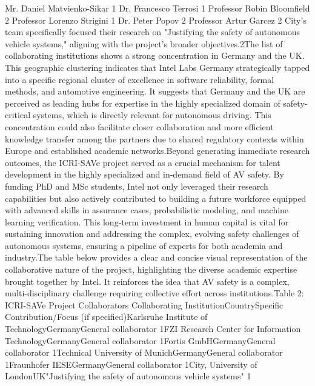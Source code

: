 Mr. Daniel Matvienko-Sikar 1
Dr. Francesco Terrosi 1
Professor Robin Bloomfield 2
Professor Lorenzo Strigini 1
Dr. Peter Popov 2
Professor Artur Garcez 2
City's team specifically focused their research on "Justifying the safety of autonomous vehicle systems," aligning with the project's broader objectives.2The list of collaborating institutions shows a strong concentration in Germany and the UK. This geographic clustering indicates that Intel Labs Germany strategically tapped into a specific regional cluster of excellence in software reliability, formal methods, and automotive engineering. It suggests that Germany and the UK are perceived as leading hubs for expertise in the highly specialized domain of safety-critical systems, which is directly relevant for autonomous driving. This concentration could also facilitate closer collaboration and more efficient knowledge transfer among the partners due to shared regulatory contexts within Europe and established academic networks.Beyond generating immediate research outcomes, the ICRI-SAVe project served as a crucial mechanism for talent development in the highly specialized and in-demand field of AV safety. By funding PhD and MSc students, Intel not only leveraged their research capabilities but also actively contributed to building a future workforce equipped with advanced skills in assurance cases, probabilistic modeling, and machine learning verification. This long-term investment in human capital is vital for sustaining innovation and addressing the complex, evolving safety challenges of autonomous systems, ensuring a pipeline of experts for both academia and industry.The table below provides a clear and concise visual representation of the collaborative nature of the project, highlighting the diverse academic expertise brought together by Intel. It reinforces the idea that AV safety is a complex, multi-disciplinary challenge requiring collective effort across institutions.Table 2: ICRI-SAVe Project Collaborators
Collaborating InstitutionCountrySpecific Contribution/Focus (if specified)Karlsruhe Institute of TechnologyGermanyGeneral collaborator 1FZI Research Center for Information TechnologyGermanyGeneral collaborator 1Fortis GmbHGermanyGeneral collaborator 1Technical University of MunichGermanyGeneral collaborator 1Fraunhofer IESEGermanyGeneral collaborator 1City, University of LondonUK"Justifying the safety of autonomous vehicle systems" 1
